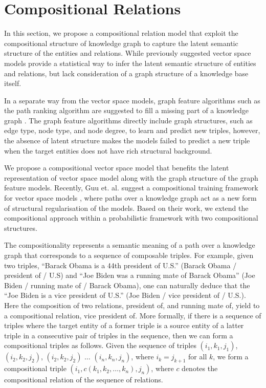 \section{Compositional Relations}
In this section, we propose a compositional relation model that exploit the compositional structure of 
knowledge graph to capture the latent semantic structure of the entities and relations. 
While previously suggested vector space models provide a statistical way to infer the latent semantic 
structure of entities and relations, but lack consideration of a graph structure of a knowledge base itself.

In a separate way from the vector space models, graph feature algorithms such as the path ranking algorithm 
are suggested to fill a missing part of a knowledge graph \cite{Lao2010}. The graph feature algorithms 
directly include graph structures, such as edge type, node type, and node degree, to learn and predict new 
triples, however, the absence of latent structure makes the models failed to predict a new triple when the 
target entities does not have rich structural background\cite{nickel2015review}.

We propose a compositional vector space model that benefits the latent representation of vector space model 
along with the graph structure of the graph feature models. Recently, Guu et. al. suggest a compositional 
training framework for vector space models \cite{gu2015traversing}, where paths over a knowledge graph act 
as a new form of structural regularisation of the models. Based on their work, we extend the compositional 
approach within a probabilistic framework with two compositional structures.

The compositionality represents a semantic meaning of a path over a knowledge graph that corresponds to a 
sequence of composable triples. 
For example, given two triples, ``Barack Obama is a 44th president of U.S.'' (Barack Obama / president of / 
U.S) and ``Joe Biden was a running mate of Barack Obama'' (Joe Biden / running mate of / Barack Obama), 
one can naturally deduce that the ``Joe Biden is a vice president of U.S.'' (Joe Biden / vice president of / U.S.). 
Here the composition of two relations, president of, and running mate of, yield to a compositional relation, 
vice president of.
More formally, if there is a sequence of triples where the target entity of a former triple is a source entity of a 
latter triple in a consecutive pair of triples in the sequence, then we can form a compositional triples 
as follows.
Given the sequence of triples
$(i_1, k_1 ,j_1)$,  $(i_2, k_2, j_2)$, $(i_2, k_2, j_2)$ $\dots$ $(i_n, k_n, j_n)$, where $i_k = j_{k+1}$ for all $k
$,  we form a compositional triple $(i_1, {c}(k_1, k_2, \dots, k_n), j_n)$, where $c$ denotes the compositional 
relation of the sequence of relations.

